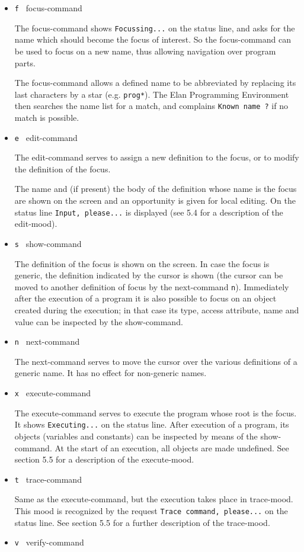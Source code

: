 \begin{itemize}
\item{\tt f } focus-command

The focus-command shows {\tt Focussing...} on the status line, and
asks for the name which should become the focus of interest.
So the focus-command can be used to focus on a new name, thus
allowing navigation over program parts. 

The focus-command allows a defined name to be abbreviated by
replacing its last characters by a star (e.g. {\tt prog*}). The Elan
Programming Environment then searches the name list for a match,
and complains {\tt Known name ?} if no match is possible.
\item{\tt e } edit-command
	
The edit-command serves to assign a new definition to the focus,
or to modify the definition of the focus. 

The name and (if present) the body of the definition whose name
is the focus are shown on the screen and an opportunity is given
for local editing. On the status line {\tt Input, please...} is displayed
(see 5.4 for a description of the edit-mood).
\item{\tt s } show-command

The definition of the focus is shown on the screen. In case
the focus is generic, the definition indicated by the cursor
is shown (the cursor can be moved to another definition of focus
by the next-command {\tt n}). Immediately after the execution
of a program it is also possible to focus on an object created
during the execution; in that case its type, access attribute,
name and value can be inspected by the show-command.
\item{\tt n } next-command

The next-command serves to move the cursor over the various
definitions of a generic name. It has no effect for non-generic
names.
\item{\tt x } execute-command

The execute-command serves to execute the program whose root
is the focus. It shows {\tt Executing...} on the status line. After
execution of a program, its objects (variables and constants)
can be inspected by means of the show-command. At the start of
an execution, all objects are made undefined. See section 5.5
for a description of the execute-mood.
\item{\tt t } trace-command

Same as the execute-command, but the execution takes place in
trace-mood. This mood is recognized by the request
{\tt Trace command, please...} on the status line.
See section 5.5 for a further description of the trace-mood.
\item{\tt v } verify-command


\end{itemize}
